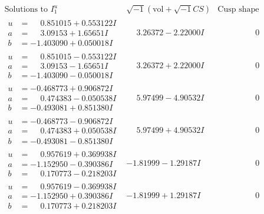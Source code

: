 \documentclass[1p]{elsarticle_modified}
\theoremstyle{definition}
\newcommand{\I}{\sqrt{-1}}
\begin{document}
$$\begin{array}{c|c|c}  
\text{Solutions to }I^u_{1}& \I (\text{vol} + \sqrt{-1}CS) & \text{Cusp shape}\\
 \hline 
\begin{aligned}
u &= \phantom{-}0.851015 + 0.553122 I \\
a &= \phantom{-}3.09153 + 1.65651 I \\
b &= -1.403090 + 0.050018 I\end{aligned}
 & \phantom{-}3.26372 - 2.22000 I & \phantom{-0.000000 } 0 \\ \hline\begin{aligned}
u &= \phantom{-}0.851015 - 0.553122 I \\
a &= \phantom{-}3.09153 - 1.65651 I \\
b &= -1.403090 - 0.050018 I\end{aligned}
 & \phantom{-}3.26372 + 2.22000 I & \phantom{-0.000000 } 0 \\ \hline\begin{aligned}
u &= -0.468773 + 0.906872 I \\
a &= \phantom{-}0.474383 - 0.050538 I \\
b &= -0.493081 + 0.851380 I\end{aligned}
 & \phantom{-}5.97499 - 4.90532 I & \phantom{-0.000000 } 0 \\ \hline\begin{aligned}
u &= -0.468773 - 0.906872 I \\
a &= \phantom{-}0.474383 + 0.050538 I \\
b &= -0.493081 - 0.851380 I\end{aligned}
 & \phantom{-}5.97499 + 4.90532 I & \phantom{-0.000000 } 0 \\ \hline\begin{aligned}
u &= \phantom{-}0.957619 + 0.369938 I \\
a &= -1.152950 - 0.390386 I \\
b &= \phantom{-}0.170773 - 0.218203 I\end{aligned}
 & -1.81999 - 1.29187 I & \phantom{-0.000000 } 0 \\ \hline\begin{aligned}
u &= \phantom{-}0.957619 - 0.369938 I \\
a &= -1.152950 + 0.390386 I \\
b &= \phantom{-}0.170773 + 0.218203 I\end{aligned}
 & -1.81999 + 1.29187 I & \phantom{-0.000000 } 0 \\ \hline\begin{aligned}

\end{aligned}
\end{array}$$
\end{document}
